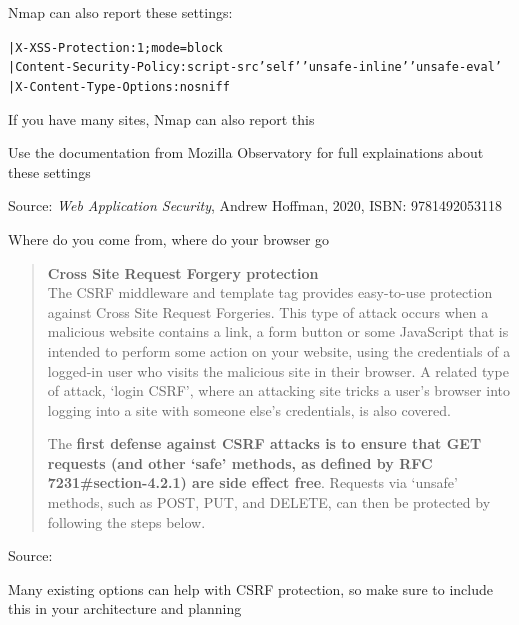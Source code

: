 \documentclass[Screen16to9,17pt]{foils}
\begin{document}
Nmap can also report these settings:
\begin{alltt}
|     X-XSS-Protection: 1;mode=block
|     Content-Security-Policy: script-src 'self' 'unsafe-inline' 'unsafe-eval'
|     X-Content-Type-Options: nosniff
\end{alltt}

\begin{list2}
\item If you have many sites, Nmap can also report this
\item Use the documentation from Mozilla Observatory for full explainations about these settings
\end{list2}


Source: \emph{Web Application Security}, Andrew Hoffman, 2020, ISBN: 9781492053118

\begin{list2}
\item Where do you come from, where do your browser go
\end{list2}



\begin{quote}{\bf
Cross Site Request Forgery protection}\\
The CSRF middleware and template tag provides easy-to-use protection against Cross Site Request Forgeries. This type of attack occurs when a malicious website contains a link, a form button or some JavaScript that is intended to perform some action on your website, using the credentials of a logged-in user who visits the malicious site in their browser. A related type of attack, ‘login CSRF’, where an attacking site tricks a user’s browser into logging into a site with someone else’s credentials, is also covered.

The {\bf first defense against CSRF attacks is to ensure that GET requests (and other ‘safe’ methods, as defined by RFC 7231\#section-4.2.1) are side effect free}. Requests via ‘unsafe’ methods, such as POST, PUT, and DELETE, can then be protected by following the steps below.
\end{quote}
Source: 

\begin{list2}
\item Many existing options can help with CSRF protection, so make sure to include this in your architecture and planning
\end{list2}
\end{document}
